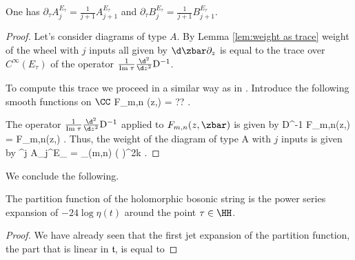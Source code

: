 \begin{lem} 
One has $\partial_\tau A^{E_\tau}_{j} = \frac{1}{j+1} A^{E_\tau}_{j+1}$ and $\partial_\tau B_j^{E_\tau} = \frac{1}{j+1} B_{j+1}^{E_\tau}$.
\end{lem}
\begin{proof} 
Let's consider diagrams of type $A$. 
By Lemma \ref{lem:weight as trace} weight of the wheel with $j$ inputs all given by $\d\zbar \partial_z$ is equal to the trace over $C^\infty(E_\tau)$ of the operator $\frac{1}{\Im \tau} \frac{\d^2}{\d z^2} {\rm D}^{-1}$.

To compute this trace we proceed in a similar way as in \cite{wg2}. 
Introduce the following smooth functions on $\CC$
\ben
F_{m,n} (z,\zbar) = ?? .
\een 

The operator $\frac{1}{\Im \tau} \frac{\d^2}{\d z^2} {\rm D}^{-1}$ applied to $F_{m,n}(z,\zbar)$ is given by
\ben
{}  {\rm D}^{-1} F_{m,n}(z,\zbar) =   F_{m,n}(z,\zbar) .
\een 
Thus, the weight of the diagram of type A with $j$ inputs is given by 
\ben
\epsilon^{j} A_{j}^{E_\tau} =  \sum_{(m,n) \in \ZZ \times \ZZ} \left(  \right)^{2k} .
\een
\end{proof}

We conclude the following. 

\begin{prop} The partition function of the holomorphic bosonic string is the power series expansion of $-24 \log \eta (t)$ around the point $\tau \in \HH$. 
\end{prop}

\begin{proof} 
We have already seen that the first jet expansion of the partition function, the part that is linear in $\mathfrak{t}$, is equal to 
\end{proof}


